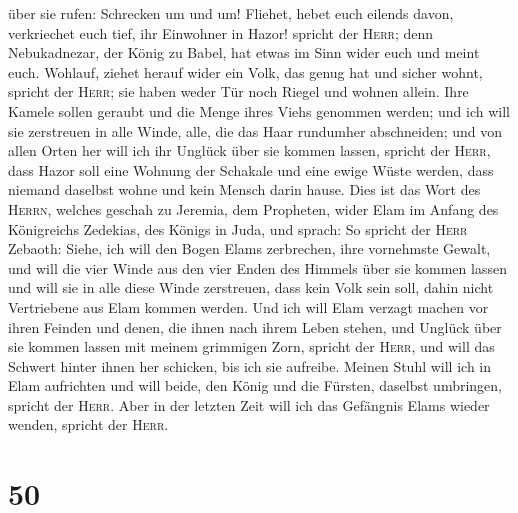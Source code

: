 über sie rufen: Schrecken um und um!  Fliehet, hebet euch
eilends davon, verkriechet euch tief, ihr Einwohner in Hazor! spricht
der \textsc{Herr}; denn Nebukadnezar, der König zu Babel, hat etwas im
Sinn wider euch und meint euch.  Wohlauf, ziehet herauf
wider ein Volk, das genug hat und sicher wohnt, spricht der
\textsc{Herr}; sie haben weder Tür noch Riegel und wohnen allein.
 Ihre Kamele sollen geraubt und die Menge ihres Viehs
genommen werden; und ich will sie zerstreuen in alle Winde, alle, die
das Haar rundumher abschneiden; und von allen Orten her will ich ihr
Unglück über sie kommen lassen, spricht der \textsc{Herr},
 dass Hazor soll eine Wohnung der Schakale und eine ewige
Wüste werden, dass niemand daselbst wohne und kein Mensch darin hause.
 Dies ist das Wort des \textsc{Herrn}, welches geschah zu
Jeremia, dem Propheten, wider Elam im Anfang des Königreichs Zedekias,
des Königs in Juda, und sprach:  So spricht der
\textsc{Herr} Zebaoth: Siehe, ich will den Bogen Elams zerbrechen, ihre
vornehmste Gewalt,  und will die vier Winde aus den vier
Enden des Himmels über sie kommen lassen und will sie in alle diese
Winde zerstreuen, dass kein Volk sein soll, dahin nicht Vertriebene aus
Elam kommen werden.  Und ich will Elam verzagt machen vor
ihren Feinden und denen, die ihnen nach ihrem Leben stehen, und Unglück
über sie kommen lassen mit meinem grimmigen Zorn, spricht der
\textsc{Herr}, und will das Schwert hinter ihnen her schicken, bis ich
sie aufreibe.  Meinen Stuhl will ich in Elam aufrichten
und will beide, den König und die Fürsten, daselbst umbringen, spricht
der \textsc{Herr}.  Aber in der letzten Zeit will ich das
Gefängnis Elams wieder wenden, spricht der \textsc{Herr}.

\hypertarget{section-49}{%
\section{50}\label{section-49}}

